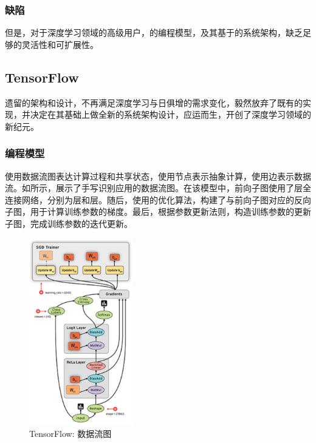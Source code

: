\begin{content}
\subsubsection{缺陷}

但是，对于深度学习领域的高级用户，的编程模型，及其基于的系统架构，缺乏足够的灵活性和可扩展性。

\begin{enum}
\end{enum}

\subsection{TensorFlow}

遗留的架构和设计，不再满足深度学习与日俱增的需求变化，毅然放弃了既有的实现，并决定在其基础上做全新的系统架构设计，应运而生，开创了深度学习领域的新纪元。

\subsubsection{编程模型}

使用数据流图表达计算过程和共享状态，使用节点表示抽象计算，使用边表示数据流。如所示，展示了手写识别应用的数据流图。在该模型中，前向子图使用了层全连接网络，分别为层和层。随后，使用的优化算法，构建了与前向子图对应的反向子图，用于计算训练参数的梯度。最后，根据参数更新法则，构造训练参数的更新子图，完成训练参数的迭代更新。

\begin{figure}[H]
\centering
\includegraphics[width=0.4\textwidth]{figures/tf-dataflow.png}
\caption{TensorFlow: 数据流图}
 \label{fig:tf-dataflow}
\end{figure}


\end{content}
